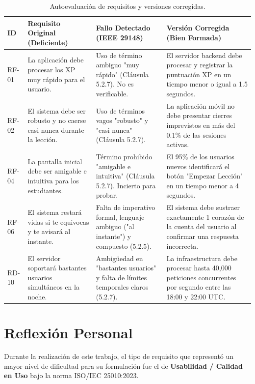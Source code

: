 \documentclass[11pt, a4paper]{article}
\begin{document}
\begin{table}[htbp]
\centering
\caption{Autoevaluación de requisitos y versiones corregidas.}
\label{tab:autoevaluacion}
\small
\begin{tabularx}{\textwidth}{l X X X}
\toprule
\textbf{ID} & \textbf{Requisito Original (Deficiente)} & \textbf{Fallo Detectado (IEEE 29148)} & \textbf{Versión Corregida (Bien Formada)} \\
\midrule
RF-01 & La aplicación debe procesar los XP muy rápido para el usuario. & Uso de término ambiguo "muy rápido" (Cláusula 5.2.7). No es verificable. & El servidor backend debe procesar y registrar la puntuación XP en un tiempo menor o igual a 1.5 segundos. \\
\midrule
RF-02 & El sistema debe ser robusto y no caerse casi nunca durante la lección. & Uso de términos vagos "robusto" y "casi nunca" (Cláusula 5.2.7). & La aplicación móvil no debe presentar cierres imprevistos en más del 0.1\% de las sesiones activas. \\
\midrule
RF-04 & La pantalla inicial debe ser amigable e intuitiva para los estudiantes. & Término prohibido "amigable e intuitiva" (Cláusula 5.2.7). Incierto para probar. & El 95\% de los usuarios nuevos identificará el botón "Empezar Lección" en un tiempo menor a 4 segundos. \\
\midrule
RF-06 & El sistema restará vidas si te equivocas y te avisará al instante. & Falta de imperativo formal, lenguaje ambiguo ("al instante") y compuesto (5.2.5). & El sistema debe sustraer exactamente 1 corazón de la cuenta del usuario al confirmar una respuesta incorrecta. \\
\midrule
RD-10 & El servidor soportará bastantes usuarios simultáneos en la noche. & Ambigüedad en "bastantes usuarios" y falta de límites temporales claros (5.2.7). & La infraestructura debe procesar hasta 40,000 peticiones concurrentes por segundo entre las 18:00 y 22:00 UTC. \\
\bottomrule
\end{tabularx}
\end{table}

\section{Reflexión Personal}
Durante la realización de este trabajo, el tipo de requisito que representó un mayor nivel de dificultad para su formulación fue el de \textbf{Usabilidad / Calidad en Uso} bajo la norma ISO/IEC 25010:2023. 
\end{document}
